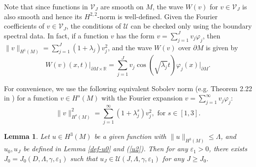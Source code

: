 \documentclass[11pt,letterpaper]{amsart}
\numberwithin{equation}{section}
\theoremstyle{definition}
\theoremstyle{plain}
\theoremstyle{definition}
\theoremstyle{plain}
\newtheorem{smallinitial}[u0]{Lemma}
\theoremstyle{definition}
\theoremstyle{plain}
\begin{document}
Note that since functions in $\mathcal{V}_J$ are smooth on $M$, the wave $W(v)$ for $v\in \mathcal{V}_J$ is also smooth and hence its $H^{2,2}$-norm is well-defined. Given the Fourier coefficients of $v\in \mathcal{V}_{J}$, the conditions of $\mathcal{U}$ can be checked only using the boundary spectral data. In fact, if a function $v$ has the form $v=\sum_{j=1}^{J}v_j \varphi_j$, then $\|v\|_{H^1(M)}=\sum_{j=1}^{J}(1+\lambda_j)v_j^2$, and the wave $W(v)$ over $\partial M$ is given by
\begin{equation}\label{waveboundary}
W(v)(x,t) \big|_{\partial M\times \mathbb{R}}= \sum_{j=1}^{J} v_j \cos(\sqrt{\lambda_j} t) \varphi_j(x)|_{\partial M}.
\end{equation}

For convenience, we use the following equivalent Sobolev norm (e.g. Theorem 2.22 in \cite{KKL}) for a function $v\in H^s(M)$ with the Fourier expansion $v=\sum_{j=1}^{\infty}v_j\varphi_j$:
\begin{equation}\label{Hkdef}
\|v\|_{H^{s}(M)}^2=\sum_{j=1}^{\infty} (1+\lambda_j^s) v_j^2,\textrm{ for }s\in [1,3].
\end{equation}

\begin{smallinitial}\label{smallinitial}
Let $u\in H^3(M)$ be a given function with $\|u\|_{H^3(M)}\leqslant \Lambda$, and $u_0,u_{J}$ be defined in Lemma \ref{def-u0} and (\ref{u2}). Then for any $\varepsilon_1>0$, there exists $J_0=J_0(D,\Lambda,\gamma,\varepsilon_1)$ such that $u_{J}\in \mathcal{U}(J,\Lambda,\gamma,\varepsilon_1)$ for any $J\geqslant J_0$.
\end{smallinitial}
\end{document}
